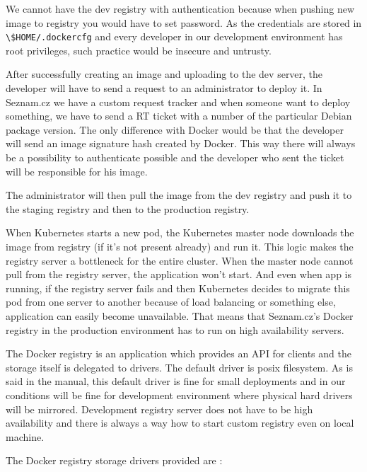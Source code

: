 We cannot have the dev registry with authentication because when pushing new image to registry you would have to set password. As the credentials are stored in \lstinline{\$HOME/.dockercfg} and every developer in our development environment has root privileges, such practice would be insecure and untrusty.

After successfully creating an image and uploading to the dev server, the developer will have to send a request to an administrator to deploy it. In Seznam.cz we have a custom request tracker and when someone want to deploy something, we have to send a RT ticket with a number of the particular Debian package version. The only difference with Docker would be that the developer will  send an image signature hash created by Docker. This way there will always be a possibility to authenticate possible and the developer who sent the ticket will be responsible for his image.

The administrator will then pull the image from the dev registry and push it to the staging registry and then to the production registry.

When Kubernetes starts a new pod, the Kubernetes master node downloads the image from registry (if it’s not present already) and run it. This logic makes the registry server a bottleneck for the entire cluster. When the master node cannot pull from the registry server, the application won’t start. And even when app is running, if the registry server fails and then Kubernetes decides to migrate this pod from one server to another because of load balancing or something else, application can easily become unavailable. That means that Seznam.cz’s Docker registry in the production environment has to run on high availability servers.

The Docker registry is an application which provides an API for clients and the storage itself is delegated to drivers. The default driver is posix filesystem.  As is said in the manual, this default driver is fine for small deployments and in our conditions will be fine for development environment where physical hard drivers will be mirrored. Development registry server does not have to be high availability and there is always a way how to start custom registry even on local machine.

The Docker registry storage drivers provided are \cite{docker-registry-storages}:

